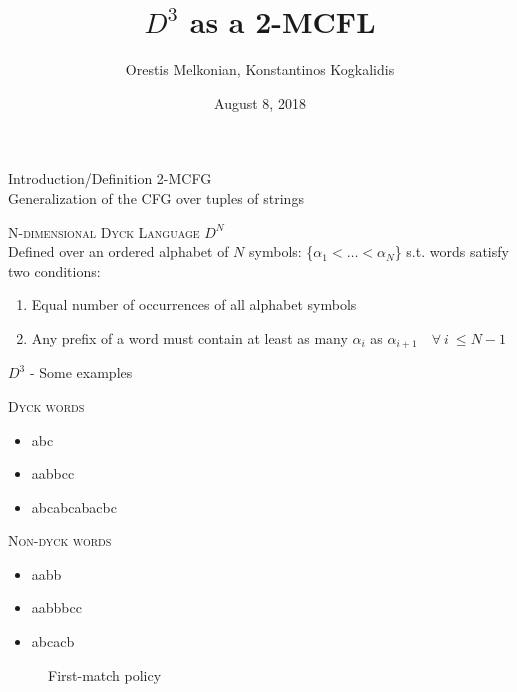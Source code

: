\documentclass{beamer}
\title{$D^3$ as a 2-MCFL}
\subtitle{}
\author{Orestis Melkonian, Konstantinos Kogkalidis}
\date{August 8, 2018}
\institute{Utrecht University}
\newcommand\tsc[1]{\alert{\textsc{#1}}}
\begin{document}
	\maketitle

	\begin{frame}{Introduction/Definition}
		\tsc{2-MCFG}\\
			Generalization of the CFG over tuples of strings	
	
	\pause
		\tsc{N-dimensional Dyck Language $D^N$}\\
			Defined over an ordered alphabet of $N$ symbols: \{$\alpha_1 < \dots < \alpha_N$\} s.t. words satisfy two conditions:
			\begin{enumerate}
				\item Equal number of occurrences of all alphabet symbols
				\item Any prefix of a word must contain at least as many $\alpha_i$ as $\alpha_{i+1} \quad \forall \ i \ \leq N-1$
			\end{enumerate}
	\end{frame}
	
	\begin{frame}{$D^3$ - Some examples}
		\hspace{1cm}
		\begin{minipage}{.4\textwidth}
		\textsc{Dyck words}
		\begin{itemize}
			\item \textcolor{ggreen}{abc}
			\item \textcolor{ggreen}{aabbcc}
			\item \textcolor{ggreen}{abcabcabacbc}
		\end{itemize}
		\end{minipage}
		\pause
		\begin{minipage}{.4\textwidth}
		\textsc{Non-dyck words}
		\begin{itemize}
			\item \textcolor{rred}{aabb}
			\pause
			\item \textcolor{rred}{aabbbcc}
			\pause
			\item \textcolor{rred}{abcacb}
		\end{itemize}
		\end{minipage}
		\vspace{1cm}
		\pause
		\begin{figure}[h!]
		\centering
		
		\caption*{First-match policy}
		\end{figure}
	\end{frame}
	
\end{document}
